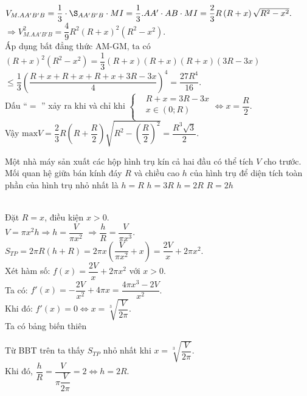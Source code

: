 \begin{ex}
{		$V_{M.A{A}'{B}'B}=\dfrac{1}{3}\cdot\S_{A{A}'{B}'B}\cdot MI=\dfrac{1}{3}.A{A}'\cdot AB\cdot MI=\dfrac{2}{3}R\left(R+x\right)\sqrt{R^2-x^2}.$\\
		$\Rightarrow V_{M.A{A}'{B}'B}^2=\dfrac{4}{9}{R^2}{\left(R+x\right)^2}\left(R^2-x^2\right).$\\
		Áp dụng bất đẳng thức AM-GM, ta có\\
		$\left(R+x\right)^2\left(R^2-x^2\right)=\dfrac{1}{3}\left(R+x\right)\left(R+x\right)\left(R+x\right)\left(3R-3x\right)$\\
		$\le\dfrac{1}{3}{\left(\dfrac{R+x+R+x+R+x+3R-3x}{4}\right)^4}=\dfrac{27R^4}{16}.$\\
		Dấu “$=$ ” xảy ra khi và chỉ khi $\left\{\begin{aligned}
			& R+x=3R-3x\\ 
			& x\in\left(0;R\right)\\ 
		\end{aligned}\right.\Leftrightarrow x=\dfrac{R}{2}.$\\
		Vậy $\text{max} V=\dfrac{2}{3}R\left(R+\dfrac{R}{2}\right)\sqrt{R^2-\left(\dfrac{R}{2}\right)^2}=\dfrac{R^3\sqrt{3}}{2}.$}
\end{ex}

\begin{ex}%
	Một nhà máy sản xuất các hộp hình trụ kín cả hai đầu có thể tích $V$ cho trước. Mối quan hệ giữa bán kính đáy $R$ và chiều cao $h$ của hình trụ để diện tích toàn phần của hình trụ nhỏ nhất là
	\choice
	{$h=R$}
	{$h=3R$}
	{\True $h=2R$}
	{$R=2h$}
	\loigiai
	{\True\\
		Đặt $R=x$, điều kiện $x>0$.\\
		$V=\pi{x^2}h\Rightarrow h=\dfrac{V}{\pi{x^2}}$ $\Rightarrow\dfrac{h}{R}=\dfrac{V}{\pi{x^3}}$.\\
		$S_{TP}=2\pi R\left(h+R\right)=2\pi x\left(\dfrac{V}{\pi{x^2}}+x\right)=\dfrac{2V}{x}+2\pi{x^2}$.\\
		Xét hàm số: $f(x)=\dfrac{2V}{x}+2\pi{x^2}$ với $x>0$.\\
		Ta có: $f'(x)=-\dfrac{2V}{x^2}+4\pi x=\dfrac{4\pi{x^3}-2V}{x^2}$.\\
		Khi đó: $f'(x)=0\Leftrightarrow x=\sqrt[3]{\dfrac{V}{2\pi}}$.\\
		Ta có bảng biến thiên
		\begin{center}
		\end{center}
		Từ BBT trên ta thấy $S_{TP}$ nhỏ nhất khi $x=\sqrt[3]{\dfrac{V}{2\pi}}$.\\
		Khi đó, $\dfrac{h}{R}=\dfrac{V}{\pi\dfrac{V}{2\pi}}=2\Leftrightarrow h=2R$.}
\end{ex}

